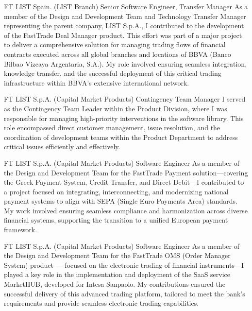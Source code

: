 \documentclass[10pt]{article} %
\begin{document}
\begin{paracol}{2}
{FT} %
{LIST Spain. (LIST Branch)} %
{Senior Software Engineer, Transfer Manager} %
{As a member of the Design and Development Team and Technology Transfer Manager representing the parent company,
LIST S.p.A., I contributed to the development of the FastTrade Deal Manager product.
This effort was part of a major project to deliver a comprehensive solution for managing trading flows of financial
contracts executed across all global branches and locations of BBVA (Banco Bilbao Vizcaya Argentaria, S.A.).
My role involved ensuring seamless integration, knowledge transfer, and the successful deployment of this critical
trading infrastructure within BBVA's extensive international network.} %

{FT} %
{LIST S.p.A. (Capital Market Products)} %
{Contingency Team Manager} %
{I served as the Contingency Team Leader within the Product Division, where I was responsible for managing
high-priority interventions in the software library. This role encompassed direct customer management,
issue resolution, and the coordination of development teams within the Product Department to address critical
issues efficiently and effectively.} %

{FT} %
{LIST S.p.A. (Capital Market Products)} %
{Software Engineer} %
{As a member of the Design and Development Team for the FastTrade Payment solution—covering the Greek Payment
System, Credit Transfer, and Direct Debit—I contributed to a project focused on integrating, interconnecting,
and modernizing national payment systems to align with SEPA (Single Euro Payments Area) standards.
My work involved ensuring seamless compliance and harmonization across diverse financial systems, supporting
the transition to a unified European payment framework.} %

\switchcolumn
\newpage

\par
\vspace*{0.5cm}

{FT} %
{LIST S.p.A. (Capital Market Products)} %
{Software Engineer} %
{As a member of the Design and Development Team for the FastTrade OMS (Order Manager System) product — focused
on the electronic trading of financial instruments—I played a key role in the implementation and deployment of the
SaaS service MarketHUB, developed for Intesa Sanpaolo.
My contributions ensured the successful delivery of this advanced trading platform, tailored to meet the bank's
requirements and provide seamless electronic trading capabilities.} %


\end{paracol}
\end{document}
